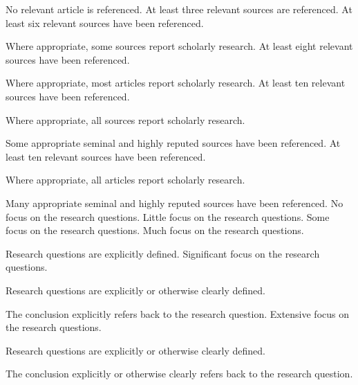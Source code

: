 \documentclass{../fal_assignment}
\begin{document}
\begin{markingrubric}
%
%
        \grade\fail 	No relevant article is referenced.
        \grade 		At least three relevant sources are referenced.
        \grade 		At least six relevant sources have been referenced.
        \par		Where appropriate, some sources report scholarly research.
        \grade 		At least eight relevant sources have been referenced.
        \par		Where appropriate, most articles report scholarly research.
        \grade 		At least ten relevant sources have been referenced.
        \par		Where appropriate, all sources report scholarly research.
        \par		Some appropriate seminal and highly reputed sources have been referenced.      
        \grade 		At least ten relevant sources have been referenced.
        \par		Where appropriate, all articles report scholarly research.
        \par		Many appropriate seminal and highly reputed sources have been referenced.   
%
        \grade\fail 	No focus on the research questions.
        \grade 		Little focus on the research questions.
        \grade 		Some focus on the research questions.
        \grade 		Much focus on the research questions.
            \par 		Research questions are explicitly defined.
        \grade 		Significant focus on the research questions.
            \par 		Research questions are explicitly or otherwise clearly defined.
            \par 		The conclusion explicitly refers back to the research question.
        \grade 		Extensive focus on the research questions.
            \par 		Research questions are explicitly or otherwise clearly defined.
            \par 		The conclusion explicitly or otherwise clearly refers back to the research question.
%

\end{markingrubric}
\end{document}
